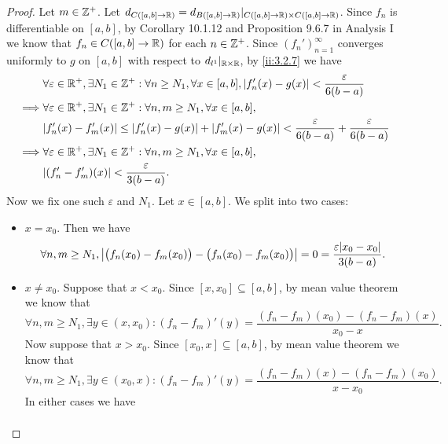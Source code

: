 \begin{proof}
  Let \(m \in \mathbb{Z}^+\).
  Let \(d_{C([a, b] \to \mathbb{R})} = d_{B([a, b] \to \mathbb{R})}|_{C([a, b] \to \mathbb{R}) \times C([a, b] \to \mathbb{R})}\).
  Since \(f_n\) is differentiable on \([a, b]\), by Corollary 10.1.12 and Proposition 9.6.7 in Analysis I we know that \(f_n \in C([a, b] \to \mathbb{R})\) for each \(n \in \mathbb{Z}^+\).
  Since \((f_n')_{n = 1}^\infty\) converges uniformly to \(g\) on \([a, b]\) with respect to \(d_{l^1}|_{\mathbb{R} \times \mathbb{R}}\), by \cref{ii:3.2.7} we have
  \begin{align*}
             & \forall \varepsilon \in \R^+, \exists N_1 \in \Z^+ : \forall n \geq N_1, \forall x \in [a, b], \abs{f_n'(x) - g(x)} < \dfrac{\varepsilon}{6(b - a)} \\
    \implies & \forall \varepsilon \in \R^+, \exists N_1 \in \Z^+ : \forall n, m \geq N_1, \forall x \in [a, b],                                                   \\
             & \abs{f_n'(x) - f_m'(x)} \leq \abs{f_n'(x) - g(x)} + \abs{f_m'(x) - g(x)} < \dfrac{\varepsilon}{6(b - a)} + \dfrac{\varepsilon}{6(b - a)}            \\
    \implies & \forall \varepsilon \in \R^+, \exists N_1 \in \Z^+ : \forall n, m \geq N_1, \forall x \in [a, b],                                                   \\
             & \abs{(f_n' - f_m')(x)} < \dfrac{\varepsilon}{3(b - a)}.
  \end{align*}
  Now we fix one such \(\varepsilon\) and \(N_1\).
  Let \(x \in [a, b]\).
  We split into two cases:
  \begin{itemize}
    \item \(x = x_0\).
          Then we have
          \[
            \forall n, m \geq N_1, \abs{\big(f_n(x_0) - f_m(x_0)\big) - \big(f_n(x_0) - f_m(x_0)\big)} = 0 = \dfrac{\varepsilon \abs{x_0 - x_0}}{3(b - a)}.
          \]
    \item \(x \neq x_0\).
          Suppose that \(x < x_0\).
          Since \([x, x_0] \subseteq [a, b]\), by mean value theorem we know that
          \[
            \forall n, m \geq N_1, \exists y \in (x, x_0) : (f_n - f_m)'(y) = \dfrac{(f_n - f_m)(x_0) - (f_n - f_m)(x)}{x_0 - x}.
          \]
          Now suppose that \(x > x_0\).
          Since \([x_0, x] \subseteq [a, b]\), by mean value theorem we know that
          \[
            \forall n, m \geq N_1, \exists y \in (x_0, x) : (f_n - f_m)'(y) = \dfrac{(f_n - f_m)(x) - (f_n - f_m)(x_0)}{x - x_0}.
          \]
          In either cases we have
          \begin{align*}

\end{align*}
\end{itemize}
\end{proof}

